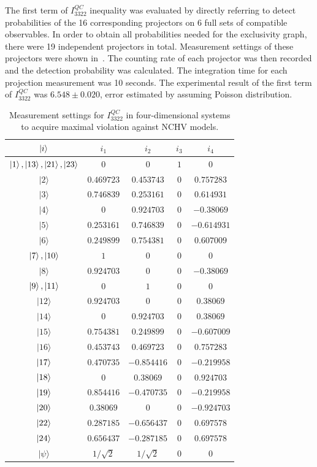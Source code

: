 \documentclass[prl,letterpaper,english,reprint,nofootinbib,aps,superscriptaddress,showpacs,showkeys]{revtex4-1}
\theoremstyle{definition}
\theoremstyle{remark}
\begin{document}
 The first term of $I_{3322}^{QC}$ inequality was evaluated by directly referring to detect probabilities of the 16 corresponding projectors on $6$ full sets of compatible observables. In order to obtain all probabilities needed for the exclusivity graph, there were 19 independent projectors in total.
 Measurement settings of these projectors were shown in~\cite{SM}.
 The counting rate of each projector was then recorded and the detection probability was calculated. The integration time for each projection measurement was 10 seconds. 
 The experimental result of the first term of $I_{3322}^{QC}$ was $6.548 \pm 0.020$, error estimated by assuming Poisson distribution.

\iffalse

\begin{table}[htbp]
    \centering
    \begin{tabular}{|c|cccc|} \hline \hline
$\ket{i}$ & $i_1$ & $i_2$ & $i_3$ & $i_4$  \\
\hline
$\ket{1}, \ket{13}, \ket{21}, \ket{23}$ & $0$ & $0$ & $1$ & $0$  \\
$|2\rangle$  & $0.469723$ & $0.453743$ & $0$ & $0.757283$  \\
$|3\rangle$ & $0.746839$ & $0.253161$ & $0$ & $0.614931$  \\
$|4\rangle$  & $0$ & $0.924703$ & $0$ & $-0.38069$  \\
$|5\rangle$ & $0.253161$ & $0.746839$ & $0$ & $-0.614931$  \\
$|6\rangle$ & $0.249899$ & $0.754381$ & $0$ & $0.607009$  \\
$\ket{7}, \ket{10}$ & $1$ & $0$ & $0$ & $0$  \\
$|8\rangle$  & $0.924703$ & $0$ & $0$ & $-0.38069$  \\
$\ket{9}, \ket{11}$  & $0$ & $1$ & $0$ & $0$  \\
$|12\rangle$  & $0.924703$ & $0$ & $0$ & $0.38069$  \\
$|14\rangle$  & $0$ & $0.924703$ & $0$ & $0.38069$  \\
$|15\rangle$ & $0.754381$ & $0.249899$ & $0$ & $-0.607009$  \\
$|16\rangle$  & $0.453743$ & $0.469723$ & $0$ & $0.757283$  \\
$\ket{17}$ & $0.470735$ & $-0.854416$ & $0$ & $-0.219958$ \\
$\ket{18}$ & $0$ & $0.38069$ & $0$ & $0.924703$ \\
$\ket{19}$ & $0.854416$ & $-0.470735$ & $0$ & $-0.219958$ \\
$\ket{20}$ & $0.38069$ & $0$ & $0$ & $-0.924703$ \\
$\ket{22}$ & $0.287185$ & $-0.656437$ & $0$ & $0.697578$ \\
$\ket{24}$ & $0.656437$ & $-0.287185$ & $0$ & $0.697578$ \\
\hline
$|\psi\rangle$ & $1/\sqrt{2}$ & $1/\sqrt{2}$ & $0$ & $0$ \\
  \hline \hline
   \end{tabular}
    \caption{Measurement settings for $I_{3322}^{QC}$ in four-dimensional systems to acquire maximal violation against NCHV models.}
    \label{tab:set19}
 \end{table}
\end{document}
